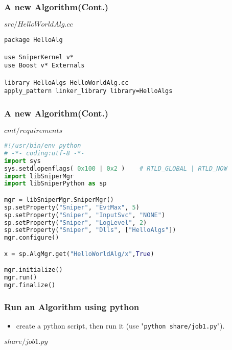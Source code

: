 \begin{frame}
    \frametitle{A new Algorithm(Cont.)}
    \begin{block}{\(src/HelloWorldAlg.cc\)}
        \par\usebox{\createalgimpl}
    \end{block}
\end{frame}

\newsavebox{\createalgcmt}
\begin{lrbox}{\createalgcmt}
\begin{lstlisting}
package HelloAlg

use SniperKernel v*
use Boost v* Externals

library HelloAlgs HelloWorldAlg.cc
apply_pattern linker_library library=HelloAlgs
\end{lstlisting}
\end{lrbox}

\begin{frame}
    \frametitle{A new Algorithm(Cont.)}
    \begin{block}{\(cmt/requirements\)}
        \par\usebox{\createalgcmt}
    \end{block}
\end{frame}

\newsavebox{\runalg}
\begin{lrbox}{\runalg}
\begin{lstlisting}[language=python]
#!/usr/bin/env python
# -*- coding:utf-8 -*-
import sys
sys.setdlopenflags( 0x100 | 0x2 )    # RTLD_GLOBAL | RTLD_NOW
import libSniperMgr
import libSniperPython as sp

mgr = libSniperMgr.SniperMgr()
sp.setProperty("Sniper", "EvtMax", 5)
sp.setProperty("Sniper", "InputSvc", "NONE")
sp.setProperty("Sniper", "LogLevel", 2)
sp.setProperty("Sniper", "Dlls", ["HelloAlgs"])
mgr.configure()

x = sp.AlgMgr.get("HelloWorldAlg/x",True)

mgr.initialize()
mgr.run()
mgr.finalize()
\end{lstlisting}
\end{lrbox}

\begin{frame}
    \frametitle{Run an Algorithm using python}
    \begin{itemize}
        \item create a python script, then run it
            (use "{\tt python share/job1.py}").
    \end{itemize}
    \begin{block}{\(share/job1.py\)}
        \par\usebox{\runalg}
    \end{block}
\end{frame}

